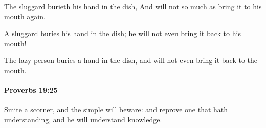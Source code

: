 			\begin{versebox}
					\item[BHS] 
					\item[ASV] The sluggard burieth his hand in the dish, And will not so much as bring it to his mouth again.
					\item[NIV] A sluggard buries his hand in the dish; he will not even bring it back to his mouth!
					\item[NRSV] The lazy person buries a hand in the dish, and will not even bring it back to the mouth.
			\end{versebox}

		\paragraph{Proverbs 19:25} %
			\label{PROVERBS-19-25}

			Smite a scorner, and the simple will beware: and reprove one that hath understanding, and he will understand knowledge.

